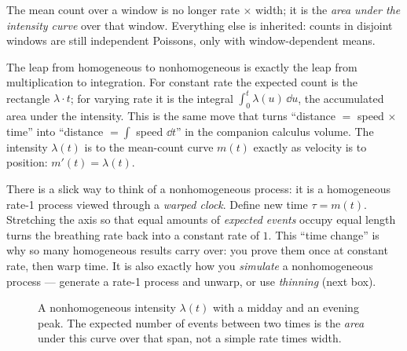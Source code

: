 The mean count over a window is no longer rate $\times$ width; it is the
\emph{area under the intensity curve} over that window. Everything else is
inherited: counts in disjoint windows are still independent Poissons, only with
window-dependent means.

\begin{connectionbox}
The leap from homogeneous to nonhomogeneous is exactly the leap from
multiplication to integration. For constant rate the expected count is the
rectangle $\lambda \cdot t$; for varying rate it is the integral $\int_0^t
\lambda(u)\,\dd u$, the accumulated area under the intensity. This is the same
move that turns ``distance $=$ speed $\times$ time'' into ``distance $=
\int$ speed $\dd t$'' in the companion calculus volume. The intensity
$\lambda(t)$ is to the mean-count curve $m(t)$ exactly as velocity is to
position: $m'(t) = \lambda(t)$.
\end{connectionbox}

\begin{happeningbox}
There is a slick way to think of a nonhomogeneous process: it is a homogeneous
rate-1 process viewed through a \emph{warped clock}. Define new time
$\tau = m(t)$. Stretching the axis so that equal amounts of \emph{expected events}
occupy equal length turns the breathing rate back into a constant rate of $1$.
This ``time change'' is why so many homogeneous results carry over: you prove them
once at constant rate, then warp time. It is also exactly how you \emph{simulate}
a nonhomogeneous process --- generate a rate-1 process and unwarp, or use
\emph{thinning} (next box).
\end{happeningbox}

\begin{figure}[H]
\centering
{}
\caption{A nonhomogeneous intensity $\lambda(t)$ with a midday and an evening
peak. The expected number of events between two times is the \emph{area} under
this curve over that span, not a simple rate times width.}
\label{ch25:fig-nonhomog}
\end{figure}

